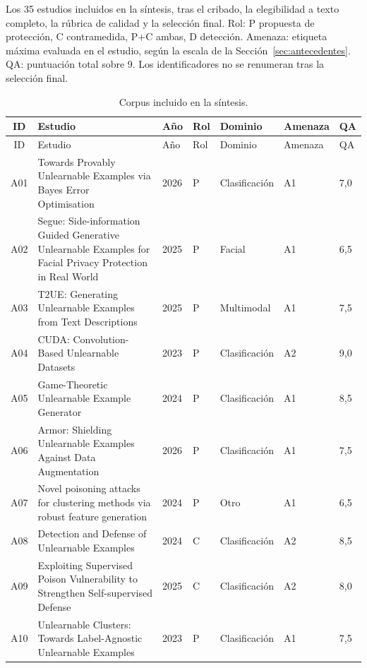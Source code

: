 \documentclass[pdflatex,sn-mathphys-num]{sn-jnl}
\theoremstyle{thmstyleone}
\theoremstyle{thmstyletwo}
\theoremstyle{thmstylethree}
\begin{document}
\begin{appendices}
Los 35 estudios incluidos en la síntesis, tras el cribado, la elegibilidad a texto completo, la rúbrica de calidad y la selección final. Rol: P propuesta de protección, C contramedida, P$+$C ambas, D detección. Amenaza: etiqueta máxima evaluada en el estudio, según la escala de la Sección~\ref{sec:antecedentes}. QA: puntuación total sobre 9. Los identificadores no se renumeran tras la selección final.

\footnotesize\setlength{\tabcolsep}{3pt}
\begin{longtable}{@{}cL{5.35cm}C{0.8cm}C{0.9cm}C{1.8cm}C{1.35cm}C{0.6cm}@{}}
\caption{Corpus incluido en la síntesis.}\label{tab:corpus}\\
\toprule
ID & Estudio & Año & Rol & Dominio & Amenaza & QA \\
\midrule
\endfirsthead
\toprule
ID & Estudio & Año & Rol & Dominio & Amenaza & QA \\
\midrule
\endhead
\botrule
\endfoot
A01 & Towards Provably Unlearnable Examples via Bayes Error Optimisation~\cite{zhang2026provably} & 2026 & P & Clasificación & A1 & 7{,}0 \\
A02 & Segue: Side-information Guided Generative Unlearnable Examples for Facial Privacy Protection in Real World~\cite{zhang2025segue} & 2025 & P & Facial & A1 & 6{,}5 \\
A03 & T2UE: Generating Unlearnable Examples from Text Descriptions~\cite{ma2025t2ue} & 2025 & P & Multimodal & A1 & 7{,}5 \\
A04 & CUDA: Convolution-Based Unlearnable Datasets~\cite{sadasivan2023cuda} & 2023 & P & Clasificación & A2 & 9{,}0 \\
A05 & Game-Theoretic Unlearnable Example Generator~\cite{liu2024game} & 2024 & P & Clasificación & A1 & 8{,}5 \\
A06 & Armor: Shielding Unlearnable Examples Against Data Augmentation~\cite{gong2026armor} & 2026 & P & Clasificación & A1 & 7{,}5 \\
A07 & Novel poisoning attacks for clustering methods via robust feature generation~\cite{zhang2024clustering} & 2024 & P & Otro & A1 & 6{,}5 \\
A08 & Detection and Defense of Unlearnable Examples~\cite{zhu2024detection} & 2024 & C & Clasificación & A2 & 8{,}5 \\
A09 & Exploiting Supervised Poison Vulnerability to Strengthen Self-supervised Defense~\cite{styborski2025exploiting} & 2025 & C & Clasificación & A2 & 8{,}0 \\
A10 & Unlearnable Clusters: Towards Label-Agnostic Unlearnable Examples~\cite{zhang2023clusters} & 2023 & P & Clasificación & A1 & 7{,}5 \\

\end{longtable}
\end{appendices}
\end{document}
